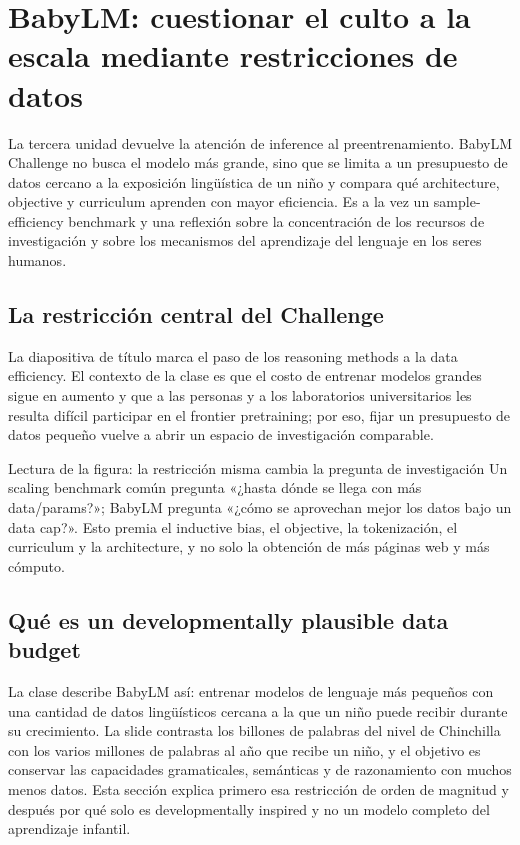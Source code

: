 \section{BabyLM: cuestionar el culto a la escala mediante restricciones de datos}

La tercera unidad devuelve la atención de inference al preentrenamiento. BabyLM Challenge no busca el modelo más grande, sino que se limita a un presupuesto de datos cercano a la exposición lingüística de un niño y compara qué architecture, objective y curriculum aprenden con mayor eficiencia. Es a la vez un sample-efficiency benchmark y una reflexión sobre la concentración de los recursos de investigación y sobre los mecanismos del aprendizaje del lenguaje en los seres humanos.

\subsection{La restricción central del Challenge}

La diapositiva de título marca el paso de los reasoning methods a la data efficiency. El contexto de la clase es que el costo de entrenar modelos grandes sigue en aumento y que a las personas y a los laboratorios universitarios les resulta difícil participar en el frontier pretraining; por eso, fijar un presupuesto de datos pequeño vuelve a abrir un espacio de investigación comparable.


\begin{knowledgebox}{Lectura de la figura: la restricción misma cambia la pregunta de investigación}
Un scaling benchmark común pregunta «¿hasta dónde se llega con más data/params?»; BabyLM pregunta «¿cómo se aprovechan mejor los datos bajo un data cap?». Esto premia el inductive bias, el objective, la tokenización, el curriculum y la architecture, y no solo la obtención de más páginas web y más cómputo.
\end{knowledgebox}

\subsection{Qué es un developmentally plausible data budget}

La clase describe BabyLM así: entrenar modelos de lenguaje más pequeños con una cantidad de datos lingüísticos cercana a la que un niño puede recibir durante su crecimiento. La slide contrasta los billones de palabras del nivel de Chinchilla con los varios millones de palabras al año que recibe un niño, y el objetivo es conservar las capacidades gramaticales, semánticas y de razonamiento con muchos menos datos. Esta sección explica primero esa restricción de orden de magnitud y después por qué solo es developmentally inspired y no un modelo completo del aprendizaje infantil.

